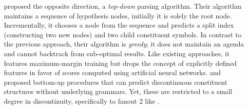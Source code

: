 \documentclass[../document.tex]{subfiles}
\begin{document}
     proposed the opposite direction, a \emph{top-down} parsing algorithm.
        Their algorithm maintains a sequence of hypothesis nodes, initially it is solely the root node.
        Incrementally, it chooses a node from the sequence and predicts a split index (constructing two new nodes) and two child constituent symbols.
    In contrast to the previous approach, their algorithm is \emph{greedy}; it does not maintain an agenda and cannot backtrack from sub-optimal results.
    Like existing approaches, it features maximum-margin training but drops the concept of explicitly defined features in favor of scores computed using artificial neural networks.
     and \citet{StaSte20} proposed bottom-up procedures that can predict discontinuous constituent structures without underlying grammars.
    Yet, these are restricted to a small degree in discontinuity, specifically to fanout 2 like .
\end{document}
